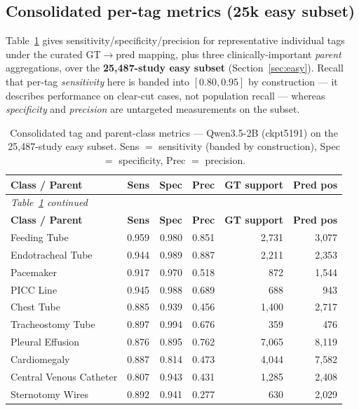 \documentclass[11pt,a4paper]{article}
\begin{document}
\subsection{Consolidated per-tag metrics (25k easy subset)}
Table~\ref{tab:consolidated} gives sensitivity/specificity/precision for representative individual tags under the curated GT$\rightarrow$pred mapping, plus three clinically-important \emph{parent} aggregations, over the \textbf{25{,}487-study easy subset} (Section~\ref{sec:easy}). Recall that per-tag \emph{sensitivity} here is banded into $[0.80,0.95]$ by construction --- it describes performance on clear-cut cases, not population recall --- whereas \emph{specificity} and \emph{precision} are untargeted measurements on the subset.

\begin{longtable}{p{5.2cm} r r r r r}
\caption{Consolidated tag and parent-class metrics --- Qwen3.5-2B (ckpt5191) on the 25{,}487-study easy subset. Sens $=$ sensitivity (banded by construction), Spec $=$ specificity, Prec $=$ precision.}
\label{tab:consolidated}\\
\toprule
\textbf{Class / Parent} & \textbf{Sens} & \textbf{Spec} & \textbf{Prec} & \textbf{GT support} & \textbf{Pred pos} \\
\midrule
\endfirsthead
\multicolumn{6}{l}{\footnotesize\itshape Table~\ref{tab:consolidated} continued}\\
\toprule
\textbf{Class / Parent} & \textbf{Sens} & \textbf{Spec} & \textbf{Prec} & \textbf{GT support} & \textbf{Pred pos} \\
\midrule
\endhead
\bottomrule
\endfoot
Feeding Tube & 0.959 & 0.980 & 0.851 & 2{,}731 & 3{,}077 \\
Endotracheal Tube & 0.944 & 0.989 & 0.887 & 2{,}211 & 2{,}353 \\
Pacemaker & 0.917 & 0.970 & 0.518 & 872 & 1{,}544 \\
PICC Line & 0.945 & 0.988 & 0.689 & 688 & 943 \\
Chest Tube & 0.885 & 0.939 & 0.456 & 1{,}400 & 2{,}717 \\
Tracheostomy Tube & 0.897 & 0.994 & 0.676 & 359 & 476 \\
Pleural Effusion & 0.876 & 0.895 & 0.762 & 7{,}065 & 8{,}119 \\
Cardiomegaly & 0.887 & 0.814 & 0.473 & 4{,}044 & 7{,}582 \\
Central Venous Catheter & 0.807 & 0.943 & 0.431 & 1{,}285 & 2{,}408 \\
Sternotomy Wires & 0.892 & 0.941 & 0.277 & 630 & 2{,}029 \\

\end{longtable}
\end{document}
